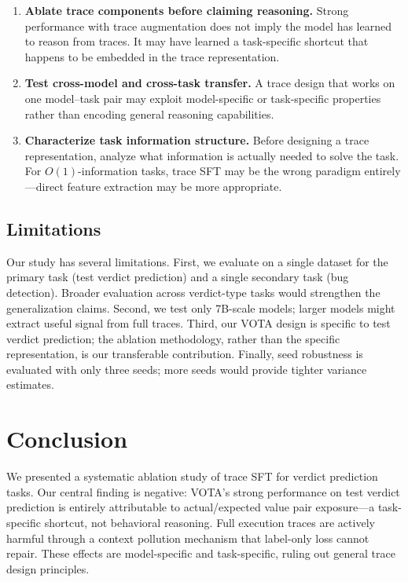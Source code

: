 \documentclass[11pt,a4paper]{article}
\begin{document}
\begin{enumerate}
\item \textbf{Ablate trace components before claiming reasoning.} Strong performance with trace augmentation does not imply the model has learned to reason from traces. It may have learned a task-specific shortcut that happens to be embedded in the trace representation.

\item \textbf{Test cross-model and cross-task transfer.} A trace design that works on one model--task pair may exploit model-specific or task-specific properties rather than encoding general reasoning capabilities.

\item \textbf{Characterize task information structure.} Before designing a trace representation, analyze what information is actually needed to solve the task. For $O(1)$-information tasks, trace SFT may be the wrong paradigm entirely---direct feature extraction may be more appropriate.
\end{enumerate}

\subsection{Limitations}

Our study has several limitations. First, we evaluate on a single dataset for the primary task (test verdict prediction) and a single secondary task (bug detection). Broader evaluation across verdict-type tasks would strengthen the generalization claims. Second, we test only 7B-scale models; larger models might extract useful signal from full traces. Third, our VOTA design is specific to test verdict prediction; the ablation methodology, rather than the specific representation, is our transferable contribution. Finally, seed robustness is evaluated with only three seeds; more seeds would provide tighter variance estimates.

\section{Conclusion}
\label{sec:conclusion}

We presented a systematic ablation study of trace SFT for verdict prediction tasks. Our central finding is negative: VOTA's strong performance on test verdict prediction is entirely attributable to actual/expected value pair exposure---a task-specific shortcut, not behavioral reasoning. Full execution traces are actively harmful through a context pollution mechanism that label-only loss cannot repair. These effects are model-specific and task-specific, ruling out general trace design principles.
\end{document}
